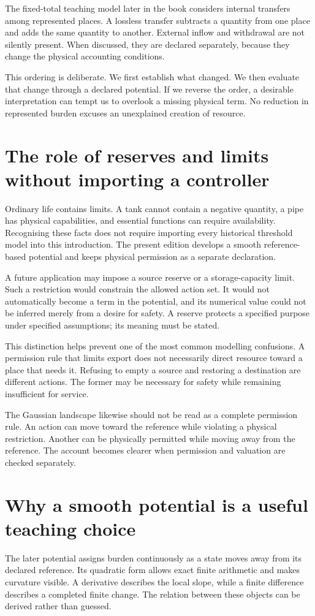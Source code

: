 The fixed-total teaching model later in the book considers internal transfers among represented places. A lossless transfer subtracts a quantity from one place and adds the same quantity to another. External inflow and withdrawal are not silently present. When discussed, they are declared separately, because they change the physical accounting conditions.

This ordering is deliberate. We first establish what changed. We then evaluate that change through a declared potential. If we reverse the order, a desirable interpretation can tempt us to overlook a missing physical term. No reduction in represented burden excuses an unexplained creation of resource.

\section{The role of reserves and limits without importing a controller}
Ordinary life contains limits. A tank cannot contain a negative quantity, a pipe has physical capabilities, and essential functions can require availability. Recognising these facts does not require importing every historical threshold model into this introduction. The present edition develops a smooth reference-based potential and keeps physical permission as a separate declaration.

A future application may impose a source reserve or a storage-capacity limit. Such a restriction would constrain the allowed action set. It would not automatically become a term in the potential, and its numerical value could not be inferred merely from a desire for safety. A reserve protects a specified purpose under specified assumptions; its meaning must be stated.

This distinction helps prevent one of the most common modelling confusions. A permission rule that limits export does not necessarily direct resource toward a place that needs it. Refusing to empty a source and restoring a destination are different actions. The former may be necessary for safety while remaining insufficient for service.

The Gaussian landscape likewise should not be read as a complete permission rule. An action can move toward the reference while violating a physical restriction. Another can be physically permitted while moving away from the reference. The account becomes clearer when permission and valuation are checked separately.

\section{Why a smooth potential is a useful teaching choice}
The later potential assigns burden continuously as a state moves away from its declared reference. Its quadratic form allows exact finite arithmetic and makes curvature visible. A derivative describes the local slope, while a finite difference describes a completed finite change. The relation between these objects can be derived rather than guessed.

